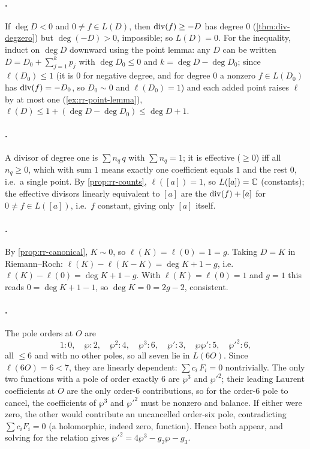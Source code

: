 \paragraph{.}
If \(\deg D < 0\) and \(0 \ne f \in L(D)\), then \(\operatorname{div}(f) \ge -D\) has
degree \(0\) (\cref{thm:div-degzero}) but \(\deg(-D) > 0\), impossible; so
\(L(D) = 0\). For the inequality, induct on \(\deg D\) downward using the point
lemma: any \(D\) can be written \(D = D_0 + \sum_{j=1}^{k} p_j\) with
\(\deg D_0 \le 0\) and \(k = \deg D - \deg D_0\); since
\(\ell(D_0) \le 1\) (it is \(0\) for negative degree, and for degree \(0\) a
nonzero \(f \in L(D_0)\) has \(\operatorname{div}(f) = -D_0\), so \(D_0 \sim 0\) and
\(\ell(D_0) = 1\)) and each added point raises \(\ell\) by at most
one (\cref{ex:rr-point-lemma}), \(\ell(D) \le 1 + (\deg D - \deg D_0) \le \deg D + 1\).

\paragraph{.}
A divisor of degree one is \(\sum n_q\,q\) with \(\sum n_q = 1\); it is effective
(\(\ge 0\)) iff all \(n_q \ge 0\), which with sum \(1\) means exactly one
coefficient equals \(1\) and the rest \(0\), i.e.\ a single point. By
\cref{prop:rr-counts}, \(\ell([a]) = 1\), so \(L([a]) = \mathbb{C}\) (constants); the
effective divisors linearly equivalent to \([a]\) are the \(\operatorname{div}(f) + [a]\)
for \(0 \ne f \in L([a])\), i.e.\ \(f\) constant, giving only \([a]\) itself.

\paragraph{.}
By \cref{prop:rr-canonical}, \(K \sim 0\), so \(\ell(K) = \ell(0) = 1 = g\). Taking
\(D = K\) in Riemann--Roch: \(\ell(K) - \ell(K - K) = \deg K + 1 - g\), i.e.\
\(\ell(K) - \ell(0) = \deg K + 1 - g\). With \(\ell(K) = \ell(0) = 1\) and
\(g = 1\) this reads \(0 = \deg K + 1 - 1\), so \(\deg K = 0 = 2g - 2\),
consistent.

\paragraph{.}
The pole orders at \(O\) are
\[
  1 \!:\! 0,\quad \wp \!:\! 2,\quad \wp^2 \!:\! 4,\quad \wp^3 \!:\! 6,\quad
  \wp' \!:\! 3,\quad \wp\wp' \!:\! 5,\quad \wp'^2 \!:\! 6,
\]
all \(\le 6\) and with no other poles, so all seven lie in \(L(6O)\). Since
\(\ell(6O) = 6 < 7\), they are linearly dependent: \(\sum c_i\,F_i = 0\)
nontrivially. The only two functions with a pole of order exactly \(6\) are
\(\wp^3\) and \(\wp'^2\); their leading Laurent coefficients at \(O\) are the
only order-\(6\) contributions, so for the order-\(6\) pole to cancel, the
coefficients of \(\wp^3\) and \(\wp'^2\) must be nonzero and balance. If either
were zero, the other would contribute an uncancelled order-six pole, contradicting
\(\sum c_i F_i = 0\) (a holomorphic, indeed zero, function). Hence both appear,
and solving for the relation gives \(\wp'^2 = 4\wp^3 - g_2\wp - g_3\).

